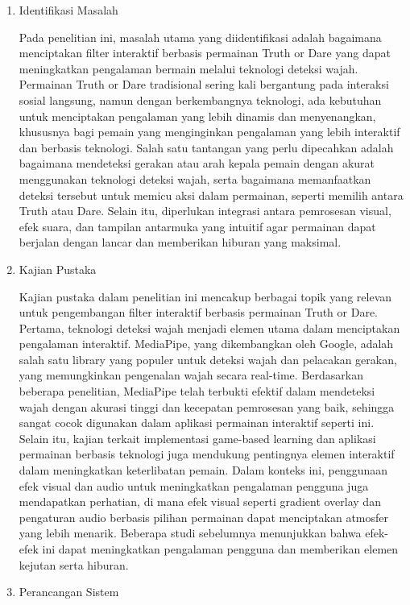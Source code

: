 \documentclass[11pt,a4paper]{article}
\begin{document}
\begin{enumerate}
    \item Identifikasi Masalah

    Pada penelitian ini, masalah utama yang diidentifikasi adalah bagaimana menciptakan filter interaktif berbasis permainan Truth or Dare yang dapat meningkatkan pengalaman bermain melalui teknologi deteksi wajah. Permainan Truth or Dare tradisional sering kali bergantung pada interaksi sosial langsung, namun dengan berkembangnya teknologi, ada kebutuhan untuk menciptakan pengalaman yang lebih dinamis dan menyenangkan, khususnya bagi pemain yang menginginkan pengalaman yang lebih interaktif dan berbasis teknologi. Salah satu tantangan yang perlu dipecahkan adalah bagaimana mendeteksi gerakan atau arah kepala pemain dengan akurat menggunakan teknologi deteksi wajah, serta bagaimana memanfaatkan deteksi tersebut untuk memicu aksi dalam permainan, seperti memilih antara Truth atau Dare. Selain itu, diperlukan integrasi antara pemrosesan visual, efek suara, dan tampilan antarmuka yang intuitif agar permainan dapat berjalan dengan lancar dan memberikan hiburan yang maksimal.
    \item Kajian Pustaka

    Kajian pustaka dalam penelitian ini mencakup berbagai topik yang relevan untuk pengembangan filter interaktif berbasis permainan Truth or Dare. Pertama, teknologi deteksi wajah menjadi elemen utama dalam menciptakan pengalaman interaktif. MediaPipe, yang dikembangkan oleh Google, adalah salah satu library yang populer untuk deteksi wajah dan pelacakan gerakan, yang memungkinkan pengenalan wajah secara real-time. Berdasarkan beberapa penelitian, MediaPipe telah terbukti efektif dalam mendeteksi wajah dengan akurasi tinggi dan kecepatan pemrosesan yang baik, sehingga sangat cocok digunakan dalam aplikasi permainan interaktif seperti ini. Selain itu, kajian terkait implementasi game-based learning dan aplikasi permainan berbasis teknologi juga mendukung pentingnya elemen interaktif dalam meningkatkan keterlibatan pemain. Dalam konteks ini, penggunaan efek visual dan audio untuk meningkatkan pengalaman pengguna juga mendapatkan perhatian, di mana efek visual seperti gradient overlay dan pengaturan audio berbasis pilihan permainan dapat menciptakan atmosfer yang lebih menarik. Beberapa studi sebelumnya menunjukkan bahwa efek-efek ini dapat meningkatkan pengalaman pengguna dan memberikan elemen kejutan serta hiburan.
    \item Perancangan Sistem


\end{enumerate}
\end{document}
